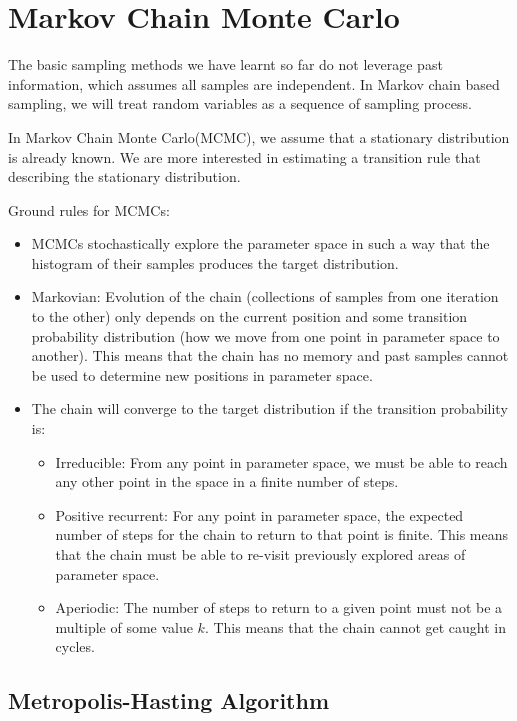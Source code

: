 \section{Markov Chain Monte Carlo}
The basic sampling methods we have learnt so far do not leverage past information, which assumes all samples are independent. In Markov chain based sampling, we will treat random variables as a sequence of sampling process. 

In Markov Chain Monte Carlo(MCMC), we assume that a stationary distribution is already known. We are more interested in estimating a transition rule that describing the stationary distribution. 

Ground rules for MCMCs:
\begin{itemize}
	\item MCMCs stochastically explore the parameter space in such a way that the histogram of their samples produces the target distribution.
	\item Markovian: Evolution of the chain (\ie collections of samples from one iteration to the other) only depends on the current position and some transition probability distribution (\ie how we move from one point in parameter space to another). This means that the chain has no memory and past samples cannot be used to determine new positions in parameter space.
	\item The chain will converge to the target distribution if the transition probability is:
		\begin{itemize}
			\item Irreducible: From any point in parameter space, we must be able to reach any other point in the space in a finite number of steps.
			\item Positive recurrent: For any point in parameter space, the expected number of steps for the chain to return to that point is finite. This means that the chain must be able to re-visit previously explored areas of parameter space.
			\item Aperiodic: The number of steps to return to a given point must not be a multiple of some value $k$. This means that the chain cannot get caught in cycles.
		\end{itemize}
\end{itemize}



\subsection{Metropolis-Hasting Algorithm}

